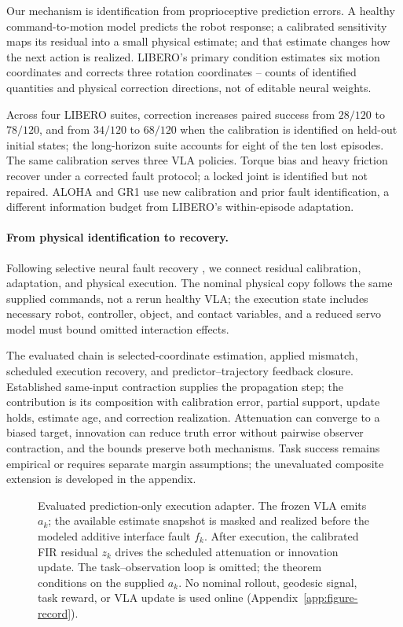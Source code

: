 Our mechanism is identification from proprioceptive prediction errors.
A healthy command-to-motion model predicts the robot response; a calibrated
sensitivity maps its residual into a small physical estimate; and that estimate
changes how the next action is realized. LIBERO's primary condition estimates six motion coordinates and corrects
three rotation coordinates -- counts of identified quantities and physical
correction directions, not of editable neural weights.

Across four LIBERO suites, correction increases paired success from
$28/120$ to $78/120$, and from $34/120$ to $68/120$ when the calibration is
identified on held-out initial states; the long-horizon suite
accounts for eight of the ten lost episodes. The same calibration serves three VLA policies. Torque
bias and heavy friction recover under a corrected fault protocol; a locked
joint is identified but not repaired. ALOHA and GR1 use new calibration and
prior fault identification, a different information budget from LIBERO's
within-episode adaptation.

\paragraph{From physical identification to recovery.}
Following selective neural fault recovery \citep{taheri2025closing}, we
connect residual calibration, adaptation, and physical execution. The nominal
physical copy follows the same supplied commands, not a rerun healthy VLA;
the execution state includes necessary robot, controller, object, and
contact variables, and a reduced servo model must bound omitted interaction
effects.

The evaluated chain is selected-coordinate estimation, applied mismatch,
scheduled execution recovery, and predictor--trajectory feedback closure.
Established same-input contraction supplies the propagation step; the
contribution is its composition with calibration error, partial support,
update holds, estimate age, and correction realization. Attenuation can
converge to a biased target, innovation can reduce truth error without
pairwise observer contraction, and the bounds preserve both mechanisms. Task
success remains empirical or requires separate margin assumptions; the
unevaluated composite extension is developed in the appendix.

\begin{figure}[t]
\centering
\resizebox{\linewidth}{!}{}
\caption{Evaluated prediction-only execution adapter. The frozen VLA emits
$a_k$; the available estimate snapshot is masked and realized before the
modeled additive interface fault $f_k$. After execution, the calibrated FIR
residual $z_k$ drives the scheduled attenuation or innovation update. The
task--observation loop is omitted; the theorem conditions on the supplied
$a_k$. No nominal rollout, geodesic signal, task reward, or VLA update is
used online (Appendix~\ref{app:figure-record}).}
\label{fig:framework}
\end{figure}
